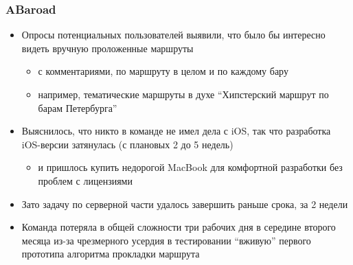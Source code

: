 \documentclass[xetex,mathserif,serif]{beamer}
\begin{document}
	\begin{frame}
		\frametitle{ABaroad}
		\begin{itemize}
			\item Опросы потенциальных пользователей выявили, что было бы интересно видеть вручную проложенные маршруты
			\begin{itemize}
				\item с комментариями, по маршруту в целом и по каждому бару
				\item например, тематические маршруты в духе ``Хипстерский маршрут по барам Петербурга''
			\end{itemize}
			\item Выяснилось, что никто в команде не имел дела с iOS, так что разработка iOS-версии затянулась (с плановых 2 до 5 недель)
			\begin{itemize}
				\item и пришлось купить недорогой MacBook для комфортной разработки без проблем с лицензиями
			\end{itemize}
			\item Зато задачу по серверной части удалось завершить раньше срока, за 2 недели
			\item Команда потеряла в общей сложности три рабочих дня в середине второго месяца из-за чрезмерного усердия в тестировании ``вживую'' первого прототипа алгоритма прокладки маршрута 
		\end{itemize}
	\end{frame}
\end{document}
